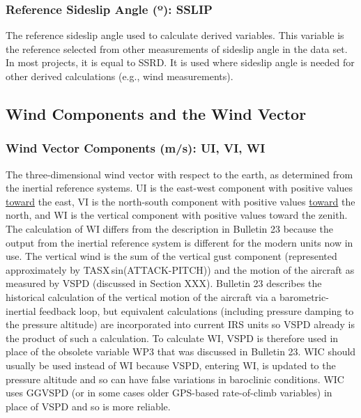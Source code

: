 \documentclass[
  english,
]{book}
\begin{document}
\hypertarget{sslip}{%
\subsubsection*{\texorpdfstring{Reference Sideslip Angle ({º}): SSLIP}{Reference Sideslip Angle (º): SSLIP}}\label{sslip}}

The reference sideslip angle used to calculate derived variables. This variable is the reference selected from other measurements of sideslip angle in the data set. In most projects, it is equal to SSRD. It is used where sideslip angle is needed for other derived calculations (e.g., wind measurements).

\hypertarget{wind-components-and-the-wind-vector}{%
\subsection{Wind Components and the Wind Vector}\label{wind-components-and-the-wind-vector}}

\hypertarget{ui-vi-wi}{%
\subsubsection*{Wind Vector Components (m/s): UI, VI, WI}\label{ui-vi-wi}}

The three-dimensional wind vector with respect to the earth, as determined from the inertial reference systems. UI is the east-west component with positive values \underline{toward} the east, VI is the north-south component with positive values \underline{toward} the north, and WI is the vertical component with positive values toward the zenith.
The calculation of WI differs from the description in Bulletin 23 because the output from the inertial reference system is different for the modern units now in use. The vertical wind is the sum of the vertical gust component (represented approximately by TASX sin(ATTACK-PITCH)) and the motion of the aircraft as measured by VSPD (discussed in Section XXX). Bulletin 23 describes the historical calculation of the vertical motion of the aircraft via a barometric-inertial feedback loop, but equivalent calculations (including pressure damping to the pressure altitude) are incorporated into current IRS units so VSPD already is the product of such a calculation. To calculate WI, VSPD is therefore used in place of the obsolete variable WP3 that was discussed in Bulletin 23.
WIC should usually be used instead of WI because VSPD, entering WI, is updated to the pressure altitude and so can have false variations in baroclinic conditions. WIC uses GGVSPD (or in some cases older GPS-based rate-of-climb variables) in place of VSPD and so is more reliable.
\end{document}
